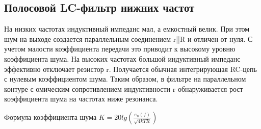 \documentclass[a4paper, 12pt]{article}%
\begin{document}
\subsection*{Полосовой LC-фильтр нижних частот}

На низких частотах индуктивный импеданс мал, а емкостный велик. При этом шум на выходе создается параллельным соединением r||R и отличен от нуля. С учетом малости коэффициента передачи это приводит к высокому уровню коэффициента шума. На высоких частотах большой индуктивный импеданс эффективно отключает резистор r. Получается обычная интегрирующая RC-цепь с нулевым коэффициентом шума. Таким образом, в фильтре на параллельном контуре с омическим сопротивлением индуктивности r обнаруживается рост коэффициента шума на частотах ниже резонанса.

Формула коэффициента шума $K = 20 lg \left( \frac{e_n(f)}{\sqrt{4 k T R}} \right)$
\end{document}
